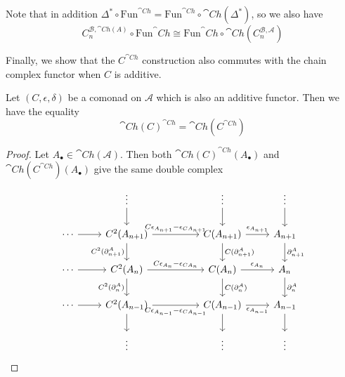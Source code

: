 Note that in addition $\Delta^*\circ \text{Fun}^{\cat{Ch}} = \text{Fun}^{\cat{Ch}}\circ \cat{Ch}(\Delta^*)$, so we also have 
\begin{equation*}
    C_n^{\mathcal{B},\cat{Ch}(A)}\circ \text{Fun}^\cat{Ch} \cong \text{Fun}^\cat{Ch}\circ \cat{Ch}(C_n^{\mathcal{B},\mathcal{A}})
\end{equation*}

Finally, we show that the $C^{\cat{Ch}}$ construction also commutes with the chain complex functor when $C$ is additive.

\begin{lem}[label=lem:ChConsPtwise]
    Let $(C,\epsilon,\delta)$ be a comonad on $\mathcal{A}$ which is also an additive functor. Then we have the equality
    \begin{equation*}
        \cat{Ch}(C)^{\cat{Ch}} = \cat{Ch}(C^{\cat{Ch}})
    \end{equation*}
\end{lem}
\begin{proof}
    Let $A_\bullet \in \cat{Ch}(\mathcal{A})$. Then both $\cat{Ch}(C)^{\cat{Ch}}(A_\bullet)$ and $\cat{Ch}(C^{\cat{Ch}})(A_\bullet)$ give the same double complex
    \[\begin{tikzcd}
        & \vdots && \vdots & \vdots \\
        \cdots & {C^2(A_{n+1})} && {C(A_{n+1})} & {A_{n+1}} \\
        \cdots & {C^2(A_n)} && {C(A_n)} & {A_n} \\
        \cdots & {C^2(A_{n-1})} && {C(A_{n-1})} & {A_{n-1}} \\
        & \vdots && \vdots & \vdots
        \arrow["{C^2(\partial_{n+1}^A)}"', from=2-2, to=3-2]
        \arrow["{C^2(\partial_n^A)}"', from=3-2, to=4-2]
        \arrow["{C(\partial_{n+1}^A)}", from=2-4, to=3-4]
        \arrow["{C(\partial_n^A)}", from=3-4, to=4-4]
        \arrow["{\partial_{n+1}^A}", from=2-5, to=3-5]
        \arrow["{\partial_n^A}", from=3-5, to=4-5]
        \arrow["{C\epsilon_{A_n}-\epsilon_{CA_n}}", from=3-2, to=3-4]
        \arrow["{\epsilon_{A_n}}", from=3-4, to=3-5]
        \arrow["{\epsilon_{A_{n-1}}}"', from=4-4, to=4-5]
        \arrow["{\epsilon_{A_{n+1}}}", from=2-4, to=2-5]
        \arrow["{C\epsilon_{A_{n+1}}-\epsilon_{CA_{n+1}}}", from=2-2, to=2-4]
        \arrow["{C\epsilon_{A_{n-1}}-\epsilon_{CA_{n-1}}}"', from=4-2, to=4-4]
        \arrow[from=4-2, to=5-2]
        \arrow[from=4-4, to=5-4]
        \arrow[from=4-5, to=5-5]
        \arrow[from=1-5, to=2-5]
        \arrow[from=1-4, to=2-4]
        \arrow[from=1-2, to=2-2]
        \arrow[from=2-1, to=2-2]
        \arrow[from=3-1, to=3-2]
        \arrow[from=4-1, to=4-2]
    \end{tikzcd}\]
\end{proof}

